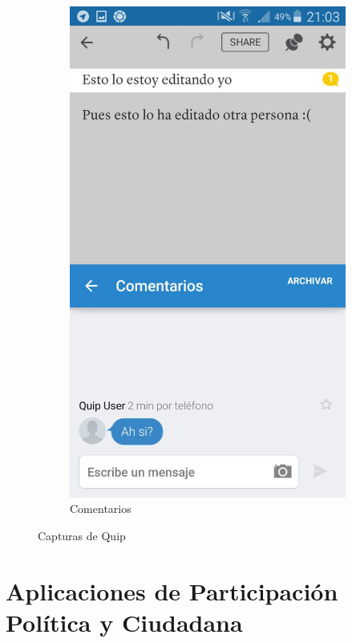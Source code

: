 \begin{figure}[H]
\begin{subfigure}[b]{0.3\textwidth}
                \includegraphics[width=\textwidth]{Media/Captures/quipComment.jpg}
                \caption{Comentarios}
                \label{fig:quipComments}
        \end{subfigure}
        \caption{Capturas de Quip}\label{fig:quipCaptures}
	\end{figure}
	
	

\section{Aplicaciones de Participación Política y Ciudadana}\label{sec:apPolYC}


